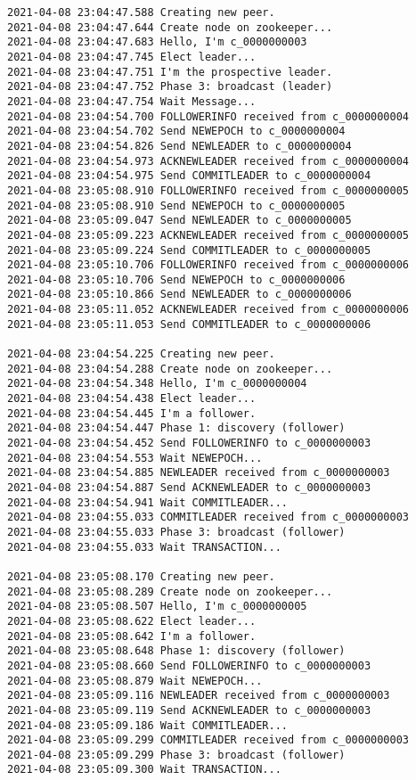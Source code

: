 \begin{verbatim}
2021-04-08 23:04:47.588 Creating new peer.
2021-04-08 23:04:47.644 Create node on zookeeper...
2021-04-08 23:04:47.683 Hello, I'm c_0000000003
2021-04-08 23:04:47.745 Elect leader...
2021-04-08 23:04:47.751 I'm the prospective leader.
2021-04-08 23:04:47.752 Phase 3: broadcast (leader)
2021-04-08 23:04:47.754 Wait Message...
2021-04-08 23:04:54.700 FOLLOWERINFO received from c_0000000004
2021-04-08 23:04:54.702 Send NEWEPOCH to c_0000000004
2021-04-08 23:04:54.826 Send NEWLEADER to c_0000000004
2021-04-08 23:04:54.973 ACKNEWLEADER received from c_0000000004
2021-04-08 23:04:54.975 Send COMMITLEADER to c_0000000004
2021-04-08 23:05:08.910 FOLLOWERINFO received from c_0000000005
2021-04-08 23:05:08.910 Send NEWEPOCH to c_0000000005
2021-04-08 23:05:09.047 Send NEWLEADER to c_0000000005
2021-04-08 23:05:09.223 ACKNEWLEADER received from c_0000000005
2021-04-08 23:05:09.224 Send COMMITLEADER to c_0000000005
2021-04-08 23:05:10.706 FOLLOWERINFO received from c_0000000006
2021-04-08 23:05:10.706 Send NEWEPOCH to c_0000000006
2021-04-08 23:05:10.866 Send NEWLEADER to c_0000000006
2021-04-08 23:05:11.052 ACKNEWLEADER received from c_0000000006
2021-04-08 23:05:11.053 Send COMMITLEADER to c_0000000006

2021-04-08 23:04:54.225 Creating new peer.
2021-04-08 23:04:54.288 Create node on zookeeper...
2021-04-08 23:04:54.348 Hello, I'm c_0000000004
2021-04-08 23:04:54.438 Elect leader...
2021-04-08 23:04:54.445 I'm a follower.
2021-04-08 23:04:54.447 Phase 1: discovery (follower)
2021-04-08 23:04:54.452 Send FOLLOWERINFO to c_0000000003
2021-04-08 23:04:54.553 Wait NEWEPOCH...
2021-04-08 23:04:54.885 NEWLEADER received from c_0000000003
2021-04-08 23:04:54.887 Send ACKNEWLEADER to c_0000000003
2021-04-08 23:04:54.941 Wait COMMITLEADER...
2021-04-08 23:04:55.033 COMMITLEADER received from c_0000000003
2021-04-08 23:04:55.033 Phase 3: broadcast (follower)
2021-04-08 23:04:55.033 Wait TRANSACTION...

2021-04-08 23:05:08.170 Creating new peer.
2021-04-08 23:05:08.289 Create node on zookeeper...
2021-04-08 23:05:08.507 Hello, I'm c_0000000005
2021-04-08 23:05:08.622 Elect leader...
2021-04-08 23:05:08.642 I'm a follower.
2021-04-08 23:05:08.648 Phase 1: discovery (follower)
2021-04-08 23:05:08.660 Send FOLLOWERINFO to c_0000000003
2021-04-08 23:05:08.879 Wait NEWEPOCH...
2021-04-08 23:05:09.116 NEWLEADER received from c_0000000003
2021-04-08 23:05:09.119 Send ACKNEWLEADER to c_0000000003
2021-04-08 23:05:09.186 Wait COMMITLEADER...
2021-04-08 23:05:09.299 COMMITLEADER received from c_0000000003
2021-04-08 23:05:09.299 Phase 3: broadcast (follower)
2021-04-08 23:05:09.300 Wait TRANSACTION...


\end{verbatim}

